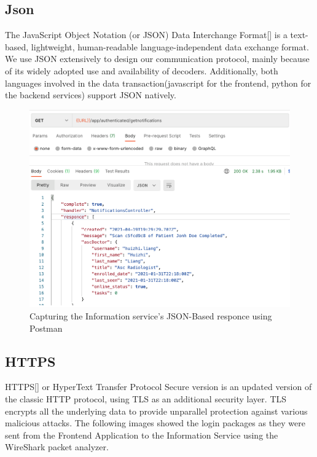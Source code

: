 		\subsection{Json}
		
			The JavaScript Object Notation (or JSON) Data Interchange Format[\cite{json-rfc7159}] is a text-based, lightweight, human-readable language-independent 
			data exchange format. We use JSON extensively to design our communication protocol, mainly because of its widely adopted use and availability 
			of decoders. Additionally, both languages involved in the data transaction(javascript for the frontend, python for the backend services) 
			support JSON natively.
			\begin{figure}[H]
				\iftrue
				\caption{Capturing the Information service's JSON-Based responce using Postman}
				\centering
				\includegraphics[scale=0.3]{figures/json}
				\fi
			\end{figure} 
		\subsection{HTTPS}
		
		
			HTTPS[\cite{rfc2818}] or HyperText Transfer Protocol Secure version is an updated version of the classic HTTP protocol, using TLS as an additional security layer. 
			TLS  encrypts all the underlying data to provide unparallel protection against various malicious attacks. The following images showed the login 
			packages as they were sent from the Frontend Application to the Information Service using the WireShark packet analyzer.

